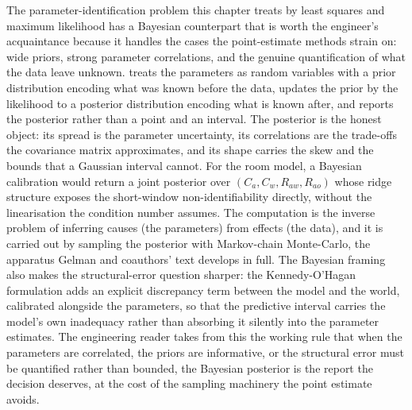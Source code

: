 \begin{mastery}
The parameter-identification problem this chapter treats by least squares
and maximum likelihood has a Bayesian counterpart that is worth the
engineer's acquaintance because it handles the cases the point-estimate
methods strain on: wide priors, strong parameter correlations, and the
genuine quantification of what the data leave unknown.  treats the parameters as random variables with a prior
distribution encoding what was known before the data, updates the prior by
the likelihood to a posterior distribution encoding what is known after,
and reports the posterior rather than a point and an interval. The
posterior is the honest object: its spread is the parameter uncertainty,
its correlations are the trade-offs the covariance matrix approximates, and
its shape carries the skew and the bounds that a Gaussian interval cannot.
For the room model, a Bayesian calibration would return a joint posterior
over $(C_a, C_w, R_{aw}, R_{ao})$ whose ridge structure exposes the
short-window non-identifiability directly, without the linearisation the
condition number assumes. The computation is the inverse problem of
inferring causes (the parameters) from effects (the data), and it is
carried out by sampling the posterior with Markov-chain Monte-Carlo, the
apparatus Gelman and coauthors' text \cite{text:ch08-gelman-bda3-2013}
develops in full. The Bayesian framing also makes the structural-error
question sharper: the Kennedy-O'Hagan formulation adds an explicit
discrepancy term between the model and the world, calibrated alongside the
parameters, so that the predictive interval carries the model's own
inadequacy rather than absorbing it silently into the parameter estimates.
The engineering reader takes from this the working rule that when the
parameters are correlated, the priors are informative, or the structural
error must be quantified rather than bounded, the Bayesian posterior is the
report the decision deserves, at the cost of the sampling machinery the
point estimate avoids.
\end{mastery}

